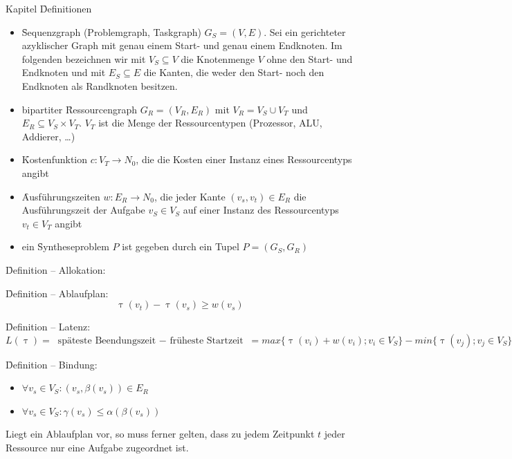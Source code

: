 \begin{chapter}{Kapitel}
\f{Definitionen}
\begin{itemize}
 \item \f{Sequenzgraph (Problemgraph, Taskgraph)} $G_S=(V,E)$. Sei ein gerichteter azyklischer Graph mit genau einem Start- und genau einem Endknoten. Im 
 folgenden bezeichnen wir mit $V_S\subseteq V$ die Knotenmenge $V$ ohne den Start- und Endknoten und mit $E_S \subseteq E$ die Kanten, die weder den Start- noch 
 den Endknoten als Randknoten besitzen. 
 \item bipartiter \f{Ressourcengraph} $G_R = (V_R, E_R)$ mit $V_R = V_S \cup V_T$ und $E_R \subseteq V_S\times V_T$. $V_T$ ist die Menge der Ressourcentypen 
 (\zb Prozessor, ALU, Addierer, \dots)
 \item \f{Kostenfunktion} $c:V_T\rightarrow N_0$, die die Kosten einer Instanz eines Ressourcentyps angibt 
 \item \f{Ausführungszeiten} $w:E_R\rightarrow N_0$, die jeder Kante $(v_s,v_t)\in E_R$ die Ausführungszeit der Aufgabe $v_S\in V_S$ auf einer Instanz des 
 Ressourcentyps $v_t \in V_T$ angibt
 \item ein \f{Syntheseproblem} $P$ ist gegeben durch ein Tupel $P = (G_S,G_R)$
\end{itemize}

\f{Definition -- Allokation}: 
\vspace*{5pt}

\f{Definition -- Ablaufplan}: 
\[\uptau(v_t) - \uptau(v_s)\geq w(v_s)\] 

\f{Definition -- Latenz}: 
\[L(\uptau) = \text{ späteste Beendungszeit $-$ früheste Startzeit } = max\{\uptau(v_i) + w(v_i); v_i \in V_S\} - min\{\uptau(v_j);v_j\in V_S\}\]

\f{Definition -- Bindung}: 
\begin{itemize}
 \item $\forall v_s \in V_S:(v_s,\beta(v_s)) \in E_R$
 \item $\forall v_s \in V_S:\gamma(v_s)\leq \alpha(\beta(v_s))$
\end{itemize}

Liegt ein Ablaufplan vor, so muss ferner gelten, dass zu jedem Zeitpunkt $t$ jeder Ressource nur eine Aufgabe zugeordnet ist.
\end{chapter}
